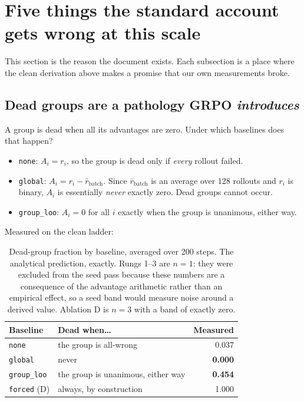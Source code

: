 \documentclass[11pt,letterpaper]{article}
\theoremstyle{definition}
\newcommand{\Adv}{A}
\begin{document}
\section{Five things the standard account gets wrong at this scale}
\label{sec:surprises}

This section is the reason the document exists. Each subsection is a place where the clean derivation
above makes a promise that our own measurements broke.

\subsection{Dead groups are a pathology GRPO \emph{introduces}}
\label{sec:deadintro}

A group is dead when all its advantages are zero. Under which baselines does that happen?

\begin{itemize}
  \item \texttt{none}: $\Adv_i = r_i$, so the group is dead only if \emph{every} rollout failed.
  \item \texttt{global}: $\Adv_i = r_i - \bar{r}_{\text{batch}}$. Since $\bar{r}_{\text{batch}}$ is an average over 128 rollouts and
        $r_i$ is binary, $\Adv_i$ is essentially \emph{never} exactly zero. Dead groups cannot occur.
  \item \texttt{group\_loo}: $\Adv_i = 0$ for all $i$ exactly when the group is unanimous, either way.
\end{itemize}

Measured on the clean ladder:

\begin{table}[H]
\centering
\caption{Dead-group fraction by baseline, averaged over 200 steps. The analytical prediction,
exactly. Rungs 1--3 are $n=1$: they were excluded from the seed pass because these numbers are a
consequence of the advantage arithmetic rather than an empirical effect, so a seed band would measure
noise around a derived value. Ablation D is $n=3$ with a band of exactly zero.}
\label{tab:dead}
\small
\begin{tabular}{@{}llr@{}}
\toprule
\textbf{Baseline} & \textbf{Dead when\ldots} & \textbf{Measured} \\
\midrule
\texttt{none}       & the group is all-wrong           & 0.037 \\
\texttt{global}     & never                            & \textbf{0.000} \\
\texttt{group\_loo} & the group is unanimous, either way & \textbf{0.454} \\
\texttt{forced} (D) & always, by construction          & 1.000 \\
\bottomrule
\end{tabular}
\end{table}
\end{document}
